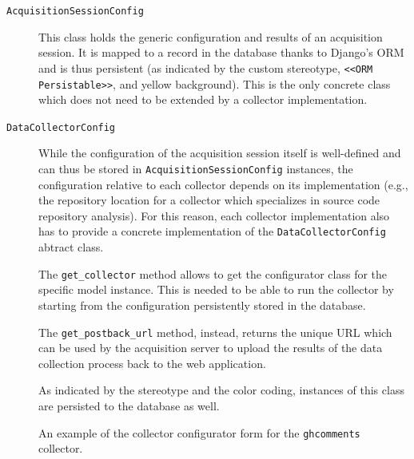 \begin{description}
  \item[\texttt{AcquisitionSessionConfig}] This class holds the generic configuration and results of an acquisition session. It is mapped to a record in the database thanks to Django's ORM and is thus persistent (as indicated by the custom stereotype, \texttt{<<ORM Persistable>>}, and yellow background). This is the only concrete class which does not need to be extended by a collector implementation.

  \item[\texttt{DataCollectorConfig}] While the configuration of the acquisition session itself is well-defined and can thus be stored in \texttt{AcquisitionSessionConfig} instances, the configuration relative to each collector depends on its implementation (e.g., the repository location for a collector which specializes in source code repository analysis). For this reason, each collector implementation also has to provide a concrete implementation of the \texttt{DataCollectorConfig} abtract class.

    The \texttt{get\_collector} method allows to get the configurator class for the specific model instance. This is needed to be able to run the collector by starting from the configuration persistently stored in the database.

    The \texttt{get\_postback\_url} method, instead, returns the unique URL which can be used by the acquisition server to upload the results of the data collection process back to the web application.

    As indicated by the stereotype and the color coding, instances of this class are persisted to the database as well.
\end{description}

\begin{figure}
	\hfill
  \caption{An example of the collector configurator form for the \texttt{ghcomments} collector.}
  \label{fig:config-panel-example}
\end{figure}

